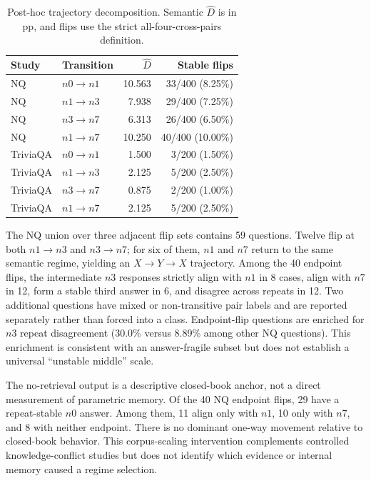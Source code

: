 \documentclass[sigconf,nonacm]{acmart}
\newcommand{\Dhat}{\widehat{D}}
\newcommand{\nzero}{\ensuremath{n0}}
\newcommand{\none}{\ensuremath{n1}}
\newcommand{\nthree}{\ensuremath{n3}}
\newcommand{\nseven}{\ensuremath{n7}}
\begin{document}
\begin{table}[t]
  \caption{Post-hoc trajectory decomposition. Semantic $\Dhat$ is in pp, and flips use the strict all-four-cross-pairs definition.}
  \label{tab:ladder}
  \small
  \begin{tabular}{llrr}
    \toprule
    \rowcolor{auditheader}
    \textcolor{auditnavy}{\textbf{Study}} & \textcolor{auditnavy}{\textbf{Transition}} & \textcolor{auditnavy}{\textbf{$\Dhat$}} & \textcolor{auditnavy}{\textbf{Stable flips}} \\
    \midrule
    NQ & $\nzero\to\none$ & 10.563 & 33/400 (8.25\%) \\
    \rowcolor{auditstripe}
    NQ & $\none\to\nthree$ & 7.938 & 29/400 (7.25\%) \\
    NQ & $\nthree\to\nseven$ & 6.313 & 26/400 (6.50\%) \\
    \rowcolor{auditstripe}
    NQ & $\none\to\nseven$ & 10.250 & 40/400 (10.00\%) \\
    \midrule
    TriviaQA & $\nzero\to\none$ & 1.500 & 3/200 (1.50\%) \\
    \rowcolor{auditstripe}
    TriviaQA & $\none\to\nthree$ & 2.125 & 5/200 (2.50\%) \\
    TriviaQA & $\nthree\to\nseven$ & 0.875 & 2/200 (1.00\%) \\
    \rowcolor{auditstripe}
    TriviaQA & $\none\to\nseven$ & 2.125 & 5/200 (2.50\%) \\
    \bottomrule
  \end{tabular}
\end{table}

The NQ union over three adjacent flip sets contains 59 questions. Twelve flip at both $\none\to\nthree$ and $\nthree\to\nseven$; for six of them, $\none$ and $\nseven$ return to the same semantic regime, yielding an $X\to Y\to X$ trajectory. Among the 40 endpoint flips, the intermediate $\nthree$ responses strictly align with $\none$ in 8 cases, align with $\nseven$ in 12, form a stable third answer in 6, and disagree across repeats in 12. Two additional questions have mixed or non-transitive pair labels and are reported separately rather than forced into a class. Endpoint-flip questions are enriched for $\nthree$ repeat disagreement (30.0\% versus 8.89\% among other NQ questions). This enrichment is consistent with an answer-fragile subset but does not establish a universal ``unstable middle'' scale.

The no-retrieval output is a descriptive closed-book anchor, not a direct measurement of parametric memory. Of the 40 NQ endpoint flips, 29 have a repeat-stable $\nzero$ answer. Among them, 11 align only with $\none$, 10 only with $\nseven$, and 8 with neither endpoint. There is no dominant one-way movement relative to closed-book behavior. This corpus-scaling intervention complements controlled knowledge-conflict studies but does not identify which evidence or internal memory caused a regime selection.
\end{document}
